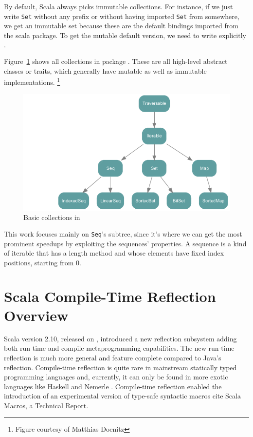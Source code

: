 By default, Scala always picks immutable collections. For instance, if we just
write \texttt{Set} without any prefix or without having imported \texttt{Set} from somewhere, we
get an immutable set because these are the default bindings imported from the scala
package. To get the mutable default version, we need to write explicitly
.

Figure~\ref{colls} shows all collections in package . These
are all high-level abstract classes or traits, which generally have mutable as
well as immutable implementations. \footnote{Figure courtesy of Matthias Doenitz}

\begin{figure}
\centering
\includegraphics{figures/colls.png}
\caption[All scala.collection collections]{%
    Basic collections in 
}
\label{colls}
\end{figure}


This work focuses mainly on \texttt{Seq}'s subtree, since it's where we can get the
most prominent speedups by exploiting the sequences' properties. A sequence is a
kind of iterable that has a length method and whose elements have fixed index
positions, starting from 0.


\section{Scala Compile-Time Reflection Overview}

Scala version 2.10, released on , introduced a new reflection
subsystem adding both run time and compile metaprogramming capabilities. The new
run-time reflection is much more general and feature complete compared to Java's
reflection. Compile-time reflection is quite rare in mainstream statically typed
programming languages and, currently, it can only be found in more exotic
 languages like Haskell  and Nemerle .
 Compile-time reflection enabled the introduction of an experimental version of type-safe
 syntactic macros {cite Scala Macros, a Technical Report}. 

